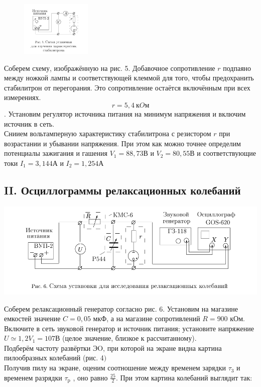 \begin{figure} 
\begin{center}
\includegraphics[width=0.3\textwidth]{5.PNG} 
\end{center}
\end{figure}

Соберем схему, изображённую на рис. 5. Добавочное сопротивление $r$ подпаяно между ножкой лампы и соответствующей клеммой для того, чтобы предохранить стабилитрон от перегорания. Это сопротивление остаётся включённым при всех измерениях. $$r = 5,4\ кOм$$. 
Установим регулятор источника питания на минимум напряжения и включим источник в сеть.\\
Сниием вольтамперную характеристику стабилитрона с резистором $r$ при возрастании и убывании напряжения. При этом как можно точнее определим потенциалы зажигания и гашения $V_{1} = 88,73 В$ и $V_{2} = 80,55 В$ и соответствующие токи $I_{1} = 3,144 А$ и $I_{2} = 1,254 А$

\subsection*{II. Осциллограммы релаксационных колебаний}   
        


\begin{center}
\includegraphics[width=\textwidth]{6.PNG} 
\end{center}


Соберем релаксационный генератор согласно рис. $6 .$
Установим на магазине емкостей значение $C=0,05$ мкФ, а на магазине сопротивлений $R=900$ кОм.\\
Включите в сеть звуковой генератор и источник питания; установите напряжение $U \simeq 1,2 V_{1} = 107 В$ (целое значение, близкое к рассчитанному).\\
Подберём частоту развёртки ЭO, при которой на экране видна картина пилообразных колебаний (рис. 4$)$\\
Получив пилу на экране, оценим соотношение между временем зарядки $\tau_{3}$ и временем разрядки $\tau_{\mathrm{p}} $ , оно равно $\frac{25}2$. При этом картина колебаний выглядит так:\\

